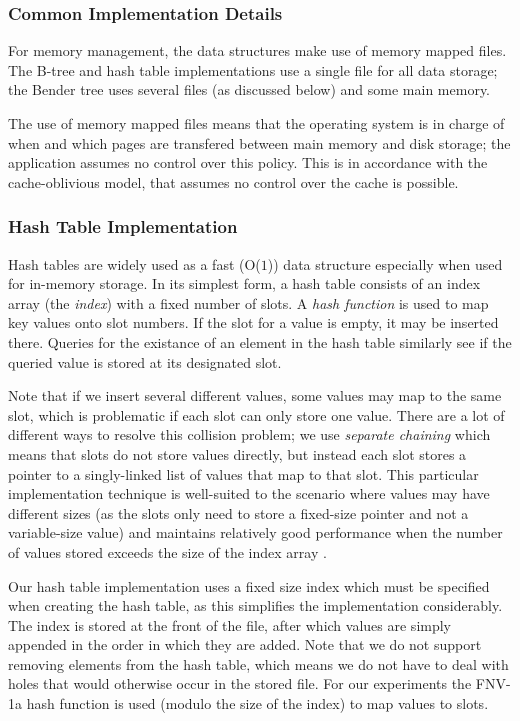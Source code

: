 \documentclass{acm_proc_article-sp}
\begin{document}
\subsubsection{Common Implementation Details}
For memory management, the data structures make use of memory mapped files. The
B-tree and hash table implementations use a single file for all data storage;
the Bender tree uses several files (as discussed below) and some main memory.

The use of memory mapped files means that the operating system is in charge of
when and which pages are transfered between main memory and disk storage; the
application assumes no control over this policy. This is in accordance with the
cache-oblivious model, that assumes no control over the cache is possible.

\subsubsection{Hash Table Implementation}
Hash tables are widely used as a fast (O($1$)) data structure especially when
used for in-memory storage. In its simplest form, a hash table consists of an
index array (the \emph{index}) with a fixed number of slots. A \emph{hash
function} is used to map key values onto slot numbers. If the slot for a value
is empty, it may be inserted there. Queries for the existance of an element in
the hash table similarly see if the queried value is stored at its designated
slot.

Note that if we insert several different values, some values may map to the
same slot, which is problematic if each slot can only store one value. There
are a lot of different ways to resolve this collision problem; we use
\emph{separate chaining} which means that slots do not store values directly,
but instead each slot stores a pointer to a singly-linked list of values that
map to that slot. This particular implementation technique is well-suited to
the scenario where values may have different sizes (as the slots only need to
store a fixed-size pointer and not a variable-size value) and maintains
relatively good performance when the number of values stored exceeds the size
of the index array \cite{sedgewick1998ac}.


Our hash table implementation uses a fixed size index which must be specified
when creating the hash table, as this simplifies the implementation
considerably. The index is stored at the front of the file, after which values
are simply appended in the order in which they are added. Note that we do not
support removing elements from the hash table, which means we do not have to
deal with holes that would otherwise occur in the stored file. For our
experiments the FNV-1a hash function \cite{noll2004fnv} is used (modulo the
size of the index) to map values to slots.
\end{document}
